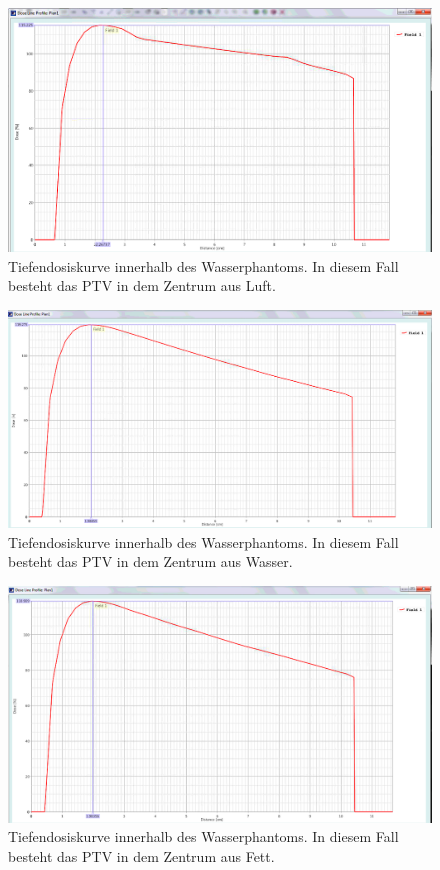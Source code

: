 \begin{figure}[H]
  \centering
  \includegraphics[width=\textwidth]{../../Wasserphantom Bilder/TDK_Luft.png}
  \caption{Tiefendosiskurve innerhalb des Wasserphantoms. In diesem Fall besteht das PTV in dem Zentrum aus Luft.}
  \label{TDK1}
\end{figure}

\begin{figure}[H]
  \centering
  \includegraphics[width=\textwidth]{../../Wasserphantom Bilder/TDK_Wasser.png}
  \caption{Tiefendosiskurve innerhalb des Wasserphantoms. In diesem Fall besteht das PTV in dem Zentrum aus Wasser.}
  \label{TDK2}
\end{figure}

\begin{figure}[H]
  \centering
  \includegraphics[width=\textwidth]{../../Wasserphantom Bilder/TDK_Fett.png}
  \caption{Tiefendosiskurve innerhalb des Wasserphantoms. In diesem Fall besteht das PTV in dem Zentrum aus Fett.}
  \label{TDK3}
\end{figure}


